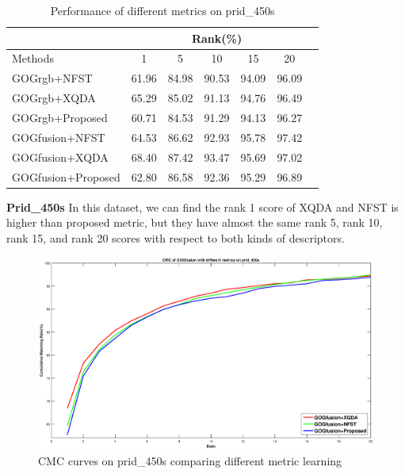 \documentclass[conference,compsoc]{IEEEtran}
\begin{document}
\begin{table}[H]
\caption{Performance of different metrics on prid\_450s}
\centering
\begin{tabular}{|l|c|c|c|c|c|c|}
\hline
& \multicolumn{5}{|c|}{Rank(\%)} \\
\hline
Methods& 1 & 5 &10& 15&20\\
\hline
GOGrgb+NFST& 61.96&84.98 &90.53& 94.09&96.09 \\  %
\hline
GOGrgb+XQDA&65.29 &85.02 & 91.13&94.76& 96.49\\ 
\hline
GOGrgb+Proposed&60.71&84.53&91.29&94.13&96.27\\  %
\hline
GOGfusion+NFST& 64.53&86.62 & 92.93&95.78&97.42 \\ 
\hline
GOGfusion+XQDA&68.40 & 87.42&93.47 &95.69& 97.02\\ 
\hline
GOGfusion+Proposed&62.80&86.58&92.36&95.29& 96.89\\ %

\hline

\end{tabular}
\end{table}
\textbf{Prid\_450s} In this dataset, we can find the rank 1 score of XQDA and NFST is higher than proposed metric, but they have almost the same rank 5, rank 10, rank 15, and rank 20 scores with respect to both kinds of descriptors. 

\begin{figure}
\begin{raggedleft}
\includegraphics[width=1\linewidth]{prid450s.eps}
\vspace{-3em}
\caption{CMC curves on prid\_450s comparing different metric learning}
\end{raggedleft}
\end{figure}
\end{document}
